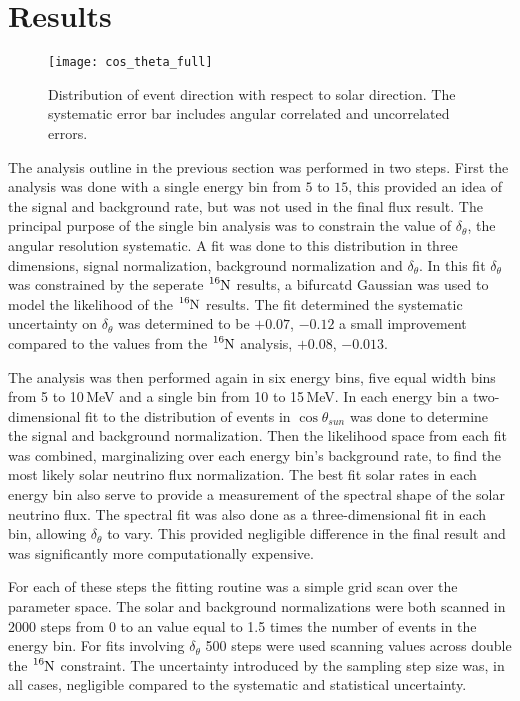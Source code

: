 \section{Results}
\begin{figure}
  \centering
  \texttt{[image: cos\_theta\_full]}
  \caption[5.0 to 15.0 MeV $\cos\theta_{sun}$ Distribution] {Distribution of event direction
                                              with respect to solar direction.
                                              The systematic error bar includes
                                              angular correlated and
                                              uncorrelated errors.}

  \label{fig:costheta}
\end{figure}
The analysis outline in the previous section was performed in two steps.
First the analysis was done with a single energy bin from $5$ to $15$,
this provided an idea of the signal and background rate, but was not used in
the final flux result.
The principal purpose of the single bin analysis was to constrain the value of
$\delta_{\theta}$, the angular resolution systematic.
A fit was done to this distribution in three dimensions, signal normalization,
background normalization and $\delta_{\theta}$.
In this fit $\delta_{\theta}$ was constrained by the seperate $\ce{^{16}N}$ 
results, a bifurcatd Gaussian was used to model the likelihood of the
$\ce{^{16}N}$ results.
The fit determined the systematic uncertainty on $\delta_{\theta}$
was determined to be $+0.07$, $-0.12$ a small improvement  compared to the values from the 
$\ce{^{16}N}$ analysis, $+0.08$, $-0.013$.

The analysis was then performed again in six energy bins, five equal width
bins from 5 to 10\,MeV and a single bin from 10 to 15\,MeV.
In each energy bin a two-dimensional fit to the distribution of events in $\cos\theta_{sun}$ was
done to determine the signal and background normalization.
Then the likelihood space from each fit was combined,
marginalizing over each energy bin's background rate,
to find the most likely solar neutrino flux normalization.
The best fit solar rates in each energy bin also serve to provide
a measurement of the spectral shape of the solar neutrino
flux.
The spectral fit was also done as a three-dimensional fit
in each bin, allowing $\delta_{\theta}$ to vary.
This provided negligible difference in the final result
and was significantly more computationally expensive.

For each of these steps the fitting routine was a simple grid scan
over the parameter space. 
The solar and background normalizations were both scanned in $2000$ steps from 0 to
an  value equal to  1.5 times the number of events in the energy bin.
For fits involving $\delta_{\theta}$ 500 steps were used scanning values across
double the $\ce{^{16}N}$ constraint.
The uncertainty introduced by the sampling step size was, in all cases, negligible
compared to the systematic and statistical uncertainty.

